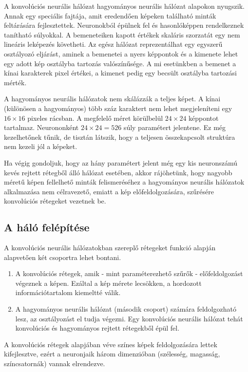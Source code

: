 A konvolúciós neurális hálózat hagyományos neurális hálózat alapokon nyugszik. Annak egy speciális fajtája, amit eredendően képeken található minták feltárására fejlesztettek. Neuronokból épülnek fel és hasonlóképpen rendelkeznek tanítható súlyokkal. A bemeneteiken kapott értékek skaláris szorzatát egy nem lineáris leképezés követheti. Az egész hálózat reprezentálhat egy egyszerű osztályozó eljárást, aminek a bemenetei a nyers képpontok és a kimenete lehet egy adott kép osztályba tartozás valószínűsége. A mi esetünkben a bemenet a kínai karakterek pixel értékei, a kimenet pedig egy becsült osztályba tartozási mérték.

A hagyományos neurális hálózatok nem skálázzák a teljes képet. A kínai (különösen a hagyományos) több száz karaktert nem lehet megjeleníteni egy $16 \times 16$ pixeles rácsban. A megfelelő méret körülbelül $24 \times 24$ képpontot tartalmaz. Neurononként $24 \times 24 = 526$ súly paramétert jelentene. Ez még kezelhetőnek tűnik, de tisztán látszik, hogy a teljesen összekapcsolt struktúra nem kezeli jól a képeket.

Ha végig gondoljuk, hogy az hány paramétert jelent még egy kis neuronszámú kevés rejtett rétegből álló hálózat esetében, akkor rájöhetünk, hogy nagyobb méretű képen fellelhető minták felismeréséhez a hagyományos neurális hálózatok alkalmazása nem célravezető, emiatt a kép előfeldolgozására, szűrésére konvolúciós rétegeket vezetnek be.

\subsection{A háló felépítése}

A konvolúciós neurális hálózatokban szereplő rétegeket funkció alapján alapvetően két csoportra lehet bontani.

\begin{enumerate}
\item A konvolúciós rétegek, amik - mint paraméterezhető szűrők - előfeldolgozást végeznek a képen. Ezáltal a kép mérete lecsökken, a hordozott információtartalom kiemeltté válik.
\item A hagyományos neurális hálózat (második csoport) számára feldolgozható lesz, az osztályozást el tudja végezni. Egy konvolúciós neurális hálózat tehát konvolúciós és hagyományos rejtett rétegekből épül fel.
\end{enumerate}

A konvolúciós rétegek alapjában véve színes képek feldolgozására lettek kifejlesztve, ezért a neuronjaik három dimenzióban (szélesség, magasság, színcsatornák) vannak elrendezve.

